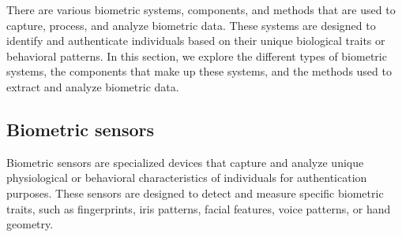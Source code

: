 \hspace{1 em}There are various biometric systems, components, and methods that are used to capture, process, 
and analyze biometric data. These systems are designed to identify and authenticate individuals based on their
 unique biological traits or behavioral patterns. In this section, we explore the different types of 
 biometric systems, the components that make up these systems, and the methods used to extract and analyze 
 biometric data.

\subsection{Biometric sensors}
Biometric sensors are specialized devices that capture and analyze unique physiological or behavioral 
characteristics of individuals for authentication purposes. These sensors are designed to detect and 
measure specific biometric traits, such as fingerprints, iris patterns, facial features, voice patterns, 
or hand geometry.